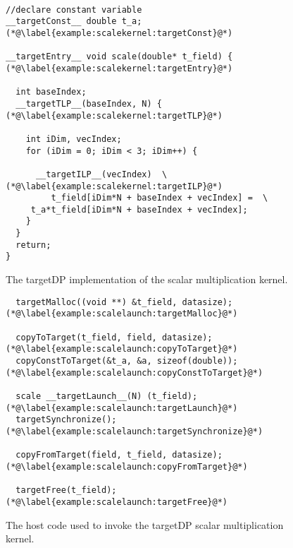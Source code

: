 \begin{figure}[h]
\begin{lstlisting}

//declare constant variable
__targetConst__ double t_a; (*@\label{example:scalekernel:targetConst}@*) 

__targetEntry__ void scale(double* t_field) { (*@\label{example:scalekernel:targetEntry}@*) 

  int baseIndex;
  __targetTLP__(baseIndex, N) { (*@\label{example:scalekernel:targetTLP}@*) 

    int iDim, vecIndex;
    for (iDim = 0; iDim < 3; iDim++) {

      __targetILP__(vecIndex)  \ (*@\label{example:scalekernel:targetILP}@*) 
         t_field[iDim*N + baseIndex + vecIndex] =  \
	 t_a*t_field[iDim*N + baseIndex + vecIndex];       	  
    }
  }
  return;
}
\end{lstlisting}
\caption{The targetDP implementation of the scalar multiplication kernel.}\label{fig:scalekernel}
\end{figure}


\begin{figure}[h]
\begin{lstlisting}
  targetMalloc((void **) &t_field, datasize); (*@\label{example:scalelaunch:targetMalloc}@*) 
  
  copyToTarget(t_field, field, datasize); (*@\label{example:scalelaunch:copyToTarget}@*) 
  copyConstToTarget(&t_a, &a, sizeof(double)); (*@\label{example:scalelaunch:copyConstToTarget}@*) 
  
  scale __targetLaunch__(N) (t_field); (*@\label{example:scalelaunch:targetLaunch}@*) 
  targetSynchronize();(*@\label{example:scalelaunch:targetSynchronize}@*) 
  
  copyFromTarget(field, t_field, datasize); (*@\label{example:scalelaunch:copyFromTarget}@*) 

  targetFree(t_field); (*@\label{example:scalelaunch:targetFree}@*) 
\end{lstlisting}
\caption{The host code used to invoke the targetDP scalar multiplication kernel.}\label{fig:scalelaunch}
\end{figure}



